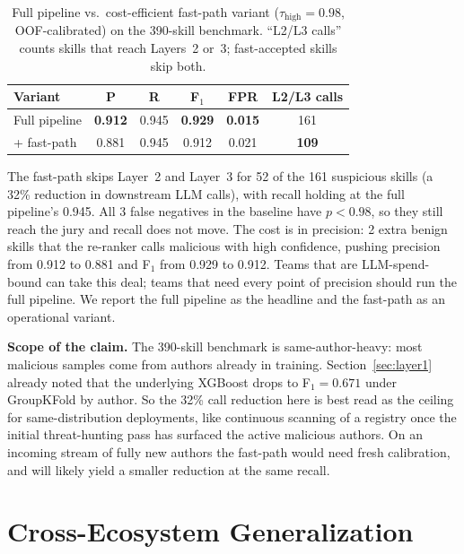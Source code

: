 \documentclass[sigconf,nonacm]{acmart}
\begin{document}
\begin{table}[!htbp]
\centering
\caption{Full pipeline vs.\ cost-efficient fast-path variant ($\tau_{\text{high}} = 0.98$, OOF-calibrated) on the 390-skill benchmark. ``L2/L3 calls'' counts skills that reach Layers~2 or~3; fast-accepted skills skip both.}
\label{tab:fastpath}
\small
\setlength{\tabcolsep}{4pt}
\begin{tabular}{lccccc}
\toprule
\textbf{Variant} & \textbf{P} & \textbf{R} & \textbf{F$_1$} & \textbf{FPR} & \textbf{L2/L3 calls} \\
\midrule
Full pipeline & \textbf{0.912} & 0.945 & \textbf{0.929} & \textbf{0.015} & 161 \\
+ fast-path & 0.881 & 0.945 & 0.912 & 0.021 & \textbf{109} \\
\bottomrule
\end{tabular}
\end{table}

The fast-path skips Layer~2 and Layer~3 for 52 of the 161 suspicious skills (a 32\% reduction in downstream LLM calls), with recall holding at the full pipeline's 0.945. All 3 false negatives in the baseline have $p < 0.98$, so they still reach the jury and recall does not move. The cost is in precision: 2 extra benign skills that the re-ranker calls malicious with high confidence, pushing precision from 0.912 to 0.881 and F$_1$ from 0.929 to 0.912. Teams that are LLM-spend-bound can take this deal; teams that need every point of precision should run the full pipeline. We report the full pipeline as the headline and the fast-path as an operational variant.

\textbf{Scope of the claim.} The 390-skill benchmark is same-author-heavy: most malicious samples come from authors already in training. Section~\ref{sec:layer1} already noted that the underlying XGBoost drops to F$_1 = 0.671$ under GroupKFold by author. So the 32\% call reduction here is best read as the ceiling for same-distribution deployments, like continuous scanning of a registry once the initial threat-hunting pass has surfaced the active malicious authors. On an incoming stream of fully new authors the fast-path would need fresh calibration, and will likely yield a smaller reduction at the same recall.

\section{Cross-Ecosystem Generalization}
\label{sec:cross-ecosystem}
\end{document}
